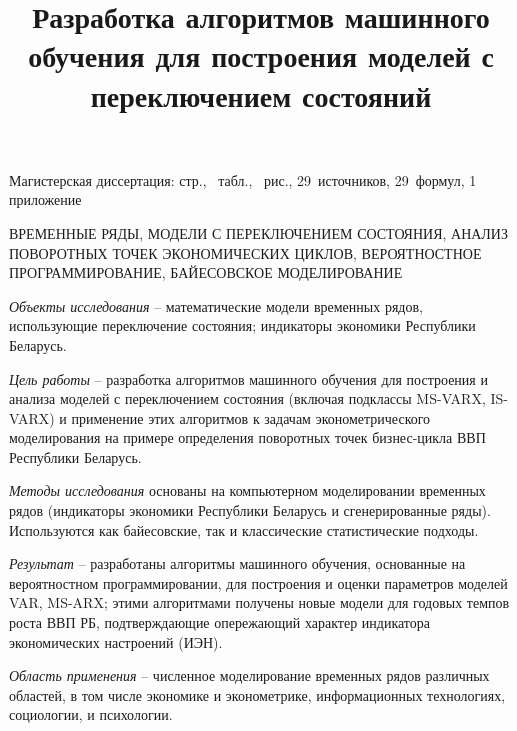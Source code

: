 \documentclass[a4paper,14pt]{extreport}
\title{Разработка алгоритмов машинного обучения для построения моделей с переключением состояний}
\author{\@authorlast \@authorfirst}
\newcommand{\totalreferences}{29}
\newcommand{\totalformulas}{29}
\begin{document}
\maketitle




Магистерская диссертация: \pageref{LastPage} стр., \totaltables\ табл., \totalfigures\ рис., \totalreferences\ источников, \totalformulas\ формул, 1 приложение

\MakeUppercase{временные ряды, модели с переключением состояния, анализ поворотных точек экономических циклов, вероятностное программирование, байесовское моделирование}

\textit{Объекты исследования} -- математические модели временных рядов, использующие переключение состояния; индикаторы экономики Республики Беларусь.

\textit{Цель работы} -- разработка алгоритмов машинного обучения для построения и анализа моделей с переключением состояния (включая подклассы MS-VARX, IS-VARX) и применение этих алгоритмов к задачам эконометрического моделирования на примере определения поворотных точек бизнес-цикла ВВП Республики Беларусь.

\textit{Методы исследования} основаны на компьютерном моделировании временных рядов (индикаторы экономики Республики Беларусь и сгенерированные ряды). Используются как байесовские, так и классические статистические подходы.

\textit{Результат} -- разработаны алгоритмы машинного обучения, основанные на вероятностном программировании, для построения и оценки параметров моделей VAR, MS-ARX; этими алгоритмами получены новые модели для годовых темпов роста ВВП РБ, подтверждающие опережающий характер индикатора экономических настроений (ИЭН). 

\textit{Область применения} -- численное моделирование временных рядов различных областей, в том числе экономике и эконометрике, информационных технологиях, социологии, и психологии.
\end{document}
